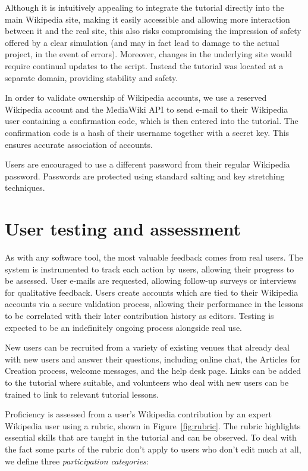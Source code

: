 \documentclass{acm_proc_article-sp}
\begin{document}
Although it is intuitively appealing to integrate the tutorial directly into the main Wikipedia site, making it easily accessible and allowing more interaction between it and the real site, this also risks compromising the impression of safety offered by a clear simulation (and may in fact lead to damage to the actual project, in the event of errors). Moreover, changes in the underlying site would require continual updates to the script. Instead the tutorial was located at a separate domain, providing stability and safety.

In order to validate ownership of Wikipedia accounts, we use a reserved Wikipedia account and the MediaWiki API to send e-mail to their Wikipedia user containing a confirmation code, which is then entered into the tutorial. The confirmation code is a hash of their username together with a secret key. This ensures accurate association of accounts.

Users are encouraged to use a different password from their regular Wikipedia password. Passwords are protected using standard salting and key stretching techniques.

\section{User testing and assessment}

As with any software tool, the most valuable feedback comes from real users. The system is instrumented to track each action by users, allowing their progress to be assessed. User e-mails are requested, allowing follow-up surveys or interviews for qualitative feedback. Users create accounts which are tied to their Wikipedia accounts via a secure validation process, allowing their performance in the lessons to be correlated with their later contribution history as editors. Testing is expected to be an indefinitely ongoing process alongside real use.

New users can be recruited from a variety of existing venues that already deal with new users and answer their questions, including online chat, the Articles for Creation process, welcome messages, and the help desk page. Links can be added to the tutorial where suitable, and volunteers who deal with new users can be trained to link to relevant tutorial lessons.

Proficiency is assessed from a user's Wikipedia contribution by an expert Wikipedia user using a rubric, shown in Figure~\ref{fig:rubric}. The rubric highlights essential skills that are taught in the tutorial and can be observed. To deal with the fact some parts of the rubric don't apply to users who don't edit much at all, we define three \emph{participation categories}:
\end{document}
